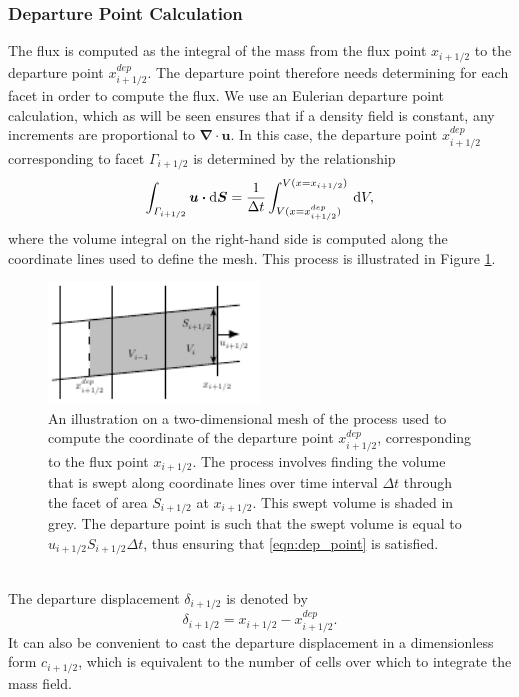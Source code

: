 \documentclass{ametsocV6.1}
\newcommand{\dx}[1]{\hspace{0.75mm}\mathrm{d}{#1}}
\begin{document}
\subsubsection{Departure Point Calculation}
The flux is computed as the integral of the mass from the flux point $x_{i+1/2}$ to the departure point $x^{dep}_{i+1/2}$.
The departure point therefore needs determining for each facet in order to compute the flux.
We use an Eulerian departure point calculation, which as will be seen ensures that if a density field is constant, any increments are proportional to $\bm{\nabla\cdot u}$.
In this case, the departure point $x^{dep}_{i+1/2}$ corresponding to facet $\varGamma_{i+1/2}$ is determined by the relationship
\begin{equation} \label{eqn:dep_point}
\int_{\varGamma_{i+1/2}} \bm{u \cdot} \mathrm{d}\bm{S} = \frac{1}{\Delta t} \int_{V(x=x^{dep}_{i+1/2})}^{V(x=x_{i+1/2})} \dx{V},
\end{equation}
where the volume integral on the right-hand side is computed along the coordinate lines used to define the mesh.
This process is illustrated in Figure \ref{fig:dep_point}. \\
\begin{figure}[h!]
\centering
\includegraphics[width=0.5\textwidth]{fig_1_dep_points.pdf}
\caption{An illustration on a two-dimensional mesh of the process used to compute the coordinate of the departure point $x^{dep}_{i+1/2}$, corresponding to the flux point $x_{i+1/2}$. The process involves finding the volume that is swept along coordinate lines over time interval $\Delta t$ through the facet of area $S_{i+1/2}$ at $x_{i+1/2}$.
This swept volume is shaded in grey.
The departure point is such that the swept volume is equal to $u_{i+1/2}S_{i+1/2}\Delta t$, thus ensuring that \eqref{eqn:dep_point} is satisfied.}
\label{fig:dep_point}
\end{figure} \\
The departure displacement $\delta_{i+1/2}$ is denoted by
\begin{equation}
\delta_{i+1/2} = x_{i+1/2} - x^{dep}_{i+1/2}.
\end{equation}
It can also be convenient to cast the departure displacement in a dimensionless form $c_{i+1/2}$, which is equivalent to the number of cells over which to integrate the mass field. \\
\end{document}
